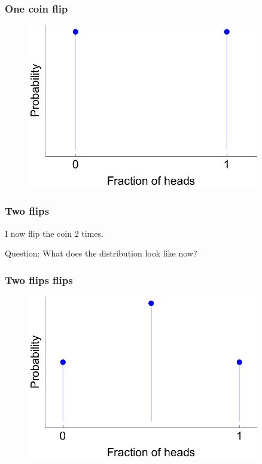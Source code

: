 \documentclass{beamer}
\begin{document}
	\begin{frame}
		\frametitle{One coin flip}
		
		\begin{figure}[ht]
			\centerline{\includegraphics[width=0.9\textwidth]{./figures/binomial_1.pdf}}
		\end{figure}
		
	\end{frame}
	
	\begin{frame}
		\frametitle{Two flips}
		I now flip the coin 2 times.
		
		\vspace{0.5cm}
		
		Question: What does the distribution look like now?
		
	\end{frame}
	
	\begin{frame}
		\frametitle{Two flips flips}
		
		\begin{figure}[ht]
			\centerline{\includegraphics[width=0.9\textwidth]{./figures/binomial_2.pdf}}
		\end{figure}
		
	\end{frame}
	
\end{document}
